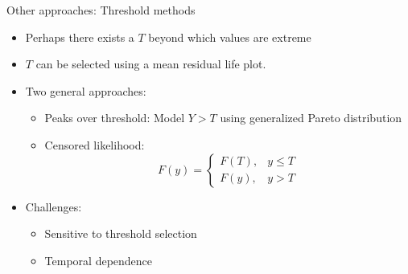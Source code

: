\documentclass{beamer}
\begin{document}
\begin{frame}{Other approaches: Threshold methods}
	\begin{itemize} \setlength{\itemsep}{1em}
		\item Perhaps there exists a $T$ beyond which values are extreme
		\item $T$ can be selected using a mean residual life plot.
		\item Two general approaches:
		\begin{itemize} \setlength{\itemsep}{0.5em}
			\item Peaks over threshold: Model $Y > T$ using generalized Pareto distribution
			\item Censored likelihood: $$F(y) = \begin{cases}
				F(T), & y \le T \\
				F(y), & y > T
			\end{cases}$$
		\end{itemize}
		\item Challenges: \vspace{0.5em}
		\begin{itemize} \setlength{\itemsep}{0.5em}
			\item Sensitive to threshold selection
			\item Temporal dependence
		\end{itemize}
	\end{itemize}
\end{frame}

\end{document}
